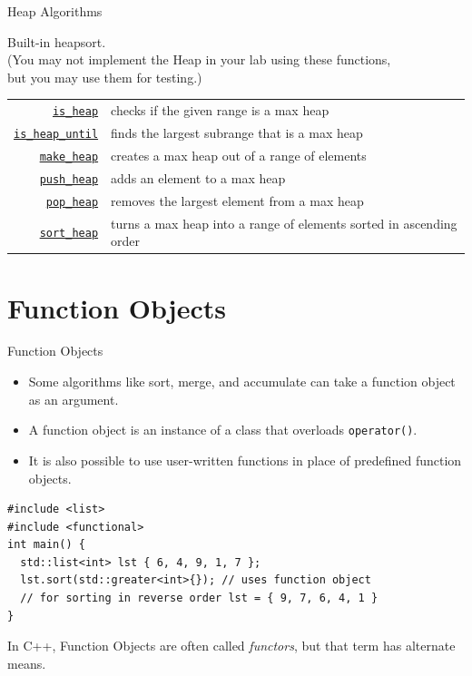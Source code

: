 \documentclass[14pt,aspectratio=1610]{beamer}
\begin{document}
\begin{frame}{Heap Algorithms}

Built-in heapsort.\\
(You may not implement the Heap in your lab using these functions,\\ but you may use them for testing.)

\footnotesize\renewcommand{\ULdepth}{3pt}\renewcommand{\arraystretch}{1.3}
\begin{tabularx}{\textwidth}{r X}
\href{https://en.cppreference.com/w/cpp/algorithm/is_heap}{\lstinline{is_heap}} &
  checks if the given range is a max heap\\
\href{https://en.cppreference.com/w/cpp/algorithm/is_heap_until}{\lstinline{is_heap_until}} &
  finds the largest subrange that is a max heap\\
\href{https://en.cppreference.com/w/cpp/algorithm/make_heap}{\lstinline{make_heap}} &
  creates a max heap out of a range of elements\\
\href{https://en.cppreference.com/w/cpp/algorithm/push_heap}{\lstinline{push_heap}} &
  adds an element to a max heap\\
\href{https://en.cppreference.com/w/cpp/algorithm/pop_heap}{\lstinline{pop_heap}} &
  removes the largest element from a max heap\\
\href{https://en.cppreference.com/w/cpp/algorithm/sort_heap}{\lstinline{sort_heap}} &
  turns a max heap into a range of elements sorted in ascending order\\
\end{tabularx}
\end{frame}

\section{Function Objects}
\begin{frame}[fragile]{Function Objects}
\small
\begin{itemize}
\item
  Some algorithms like sort, merge, and accumulate can take a function object as an argument.
\item
  A function object is an instance of a class that overloads \lstinline{operator()}.
\item
  It is also possible to use user-written functions in place of predefined function objects.
\end{itemize}
\small
\begin{lstlisting}[basicstyle=\small\ttfamily]
#include <list>
#include <functional>
int main() {
  std::list<int> lst { 6, 4, 9, 1, 7 };
  lst.sort(std::greater<int>{}); // uses function object
  // for sorting in reverse order lst = { 9, 7, 6, 4, 1 }
}
\end{lstlisting}
In C++, Function Objects are often called \emph{functors}, but that term has alternate means.
\end{frame}
\end{document}
